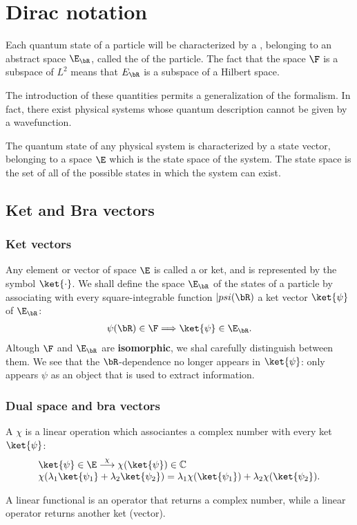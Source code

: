 \section{Dirac notation}
Each quantum state of a particle will be characterized by a ,  belonging to an abstract space $\E_{\bR}$, called the
 of the particle. The fact that the space $\F$ is a subspace of $L^2$ means that $E_{\bR}$ is a subspace 
of a Hilbert space.

The introduction of these quantities permits a generalization of the formalism. In fact,
there exist physical systems whose quantum description cannot be given by a wavefunction.

\begin{definition}
    The quantum state of any physical system is characterized by a state vector, belonging to a space $\E$ which is the state 
    space of the system. 
    The state space is the set of all of the possible states in which the system can exist.
\end{definition}
\subsection{Ket and Bra vectors}
\subsubsection{Ket vectors}
Any element or vector of space $\E$ is called a  or ket, and is represented by the 
symbol $\ket{\cdot}$. We shall define the space $\E_{\bR}$ of the states of a particle by associating with every 
square-integrable function $|psi(\bR)$ a ket vector $\ket{\psi}$ of $\E_{\bR}$:
\begin{align}
    \psi(\bR)\in\F\Longrightarrow\ket{\psi}\in\E_{\bR}.
\end{align}
Altough $\F$  and $\E_{\bR}$ are \textbf{isomorphic}, we shal carefully distinguish between them. We see that the $\bR$-dependence no 
longer appears in $\ket{\psi}$: only appears $\psi$ as an object that is used to extract information. 
\subsubsection{Dual space and bra vectors}
A  $\chi$ is a linear operation which associantes a complex number with every ket $\ket{\psi}$:
\begin{align}
    \begin{array}{l}
        \ket{\psi}\in\E\stackrel{\chi}{\longrightarrow}\chi(\ket{\psi})\in\mathbb{C}\\
        \chi(\lambda_1\ket{\psi_1}+\lambda_2\ket{\psi_2})=\lambda_1\chi(\ket{\psi_1})+\lambda_2\chi(\ket{\psi_2}).
    \end{array}
\end{align}
\begin{emphasizer}
    A linear functional is an operator that returns a complex number, while a linear operator returns another ket (vector).
\end{emphasizer}

